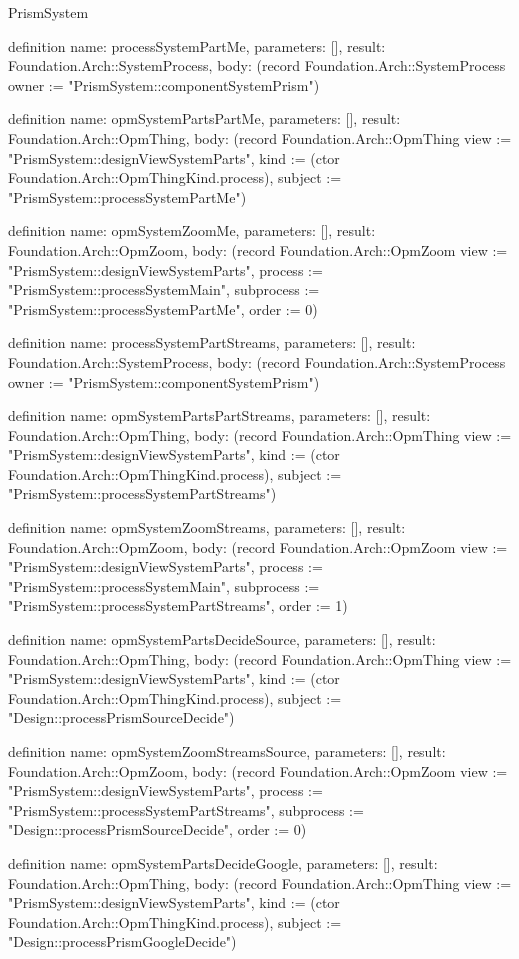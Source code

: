 \begin{lexlean}{PrismSystem}
\begin{semanticmodule}
definition{
  name: processSystemPartMe,
  parameters: [],
  result: Foundation.Arch::SystemProcess,
  body: (record Foundation.Arch::SystemProcess {owner := "PrismSystem::componentSystemPrism"})
}

definition{
  name: opmSystemPartsPartMe,
  parameters: [],
  result: Foundation.Arch::OpmThing,
  body: (record Foundation.Arch::OpmThing {view := "PrismSystem::designViewSystemParts", kind := (ctor Foundation.Arch::OpmThingKind.process), subject := "PrismSystem::processSystemPartMe"})
}

definition{
  name: opmSystemZoomMe,
  parameters: [],
  result: Foundation.Arch::OpmZoom,
  body: (record Foundation.Arch::OpmZoom {view := "PrismSystem::designViewSystemParts", process := "PrismSystem::processSystemMain", subprocess := "PrismSystem::processSystemPartMe", order := 0})
}

definition{
  name: processSystemPartStreams,
  parameters: [],
  result: Foundation.Arch::SystemProcess,
  body: (record Foundation.Arch::SystemProcess {owner := "PrismSystem::componentSystemPrism"})
}

definition{
  name: opmSystemPartsPartStreams,
  parameters: [],
  result: Foundation.Arch::OpmThing,
  body: (record Foundation.Arch::OpmThing {view := "PrismSystem::designViewSystemParts", kind := (ctor Foundation.Arch::OpmThingKind.process), subject := "PrismSystem::processSystemPartStreams"})
}

definition{
  name: opmSystemZoomStreams,
  parameters: [],
  result: Foundation.Arch::OpmZoom,
  body: (record Foundation.Arch::OpmZoom {view := "PrismSystem::designViewSystemParts", process := "PrismSystem::processSystemMain", subprocess := "PrismSystem::processSystemPartStreams", order := 1})
}

definition{
  name: opmSystemPartsDecideSource,
  parameters: [],
  result: Foundation.Arch::OpmThing,
  body: (record Foundation.Arch::OpmThing {view := "PrismSystem::designViewSystemParts", kind := (ctor Foundation.Arch::OpmThingKind.process), subject := "Design::processPrismSourceDecide"})
}

definition{
  name: opmSystemZoomStreamsSource,
  parameters: [],
  result: Foundation.Arch::OpmZoom,
  body: (record Foundation.Arch::OpmZoom {view := "PrismSystem::designViewSystemParts", process := "PrismSystem::processSystemPartStreams", subprocess := "Design::processPrismSourceDecide", order := 0})
}

definition{
  name: opmSystemPartsDecideGoogle,
  parameters: [],
  result: Foundation.Arch::OpmThing,
  body: (record Foundation.Arch::OpmThing {view := "PrismSystem::designViewSystemParts", kind := (ctor Foundation.Arch::OpmThingKind.process), subject := "Design::processPrismGoogleDecide"})
}


\end{semanticmodule}
\end{lexlean}
